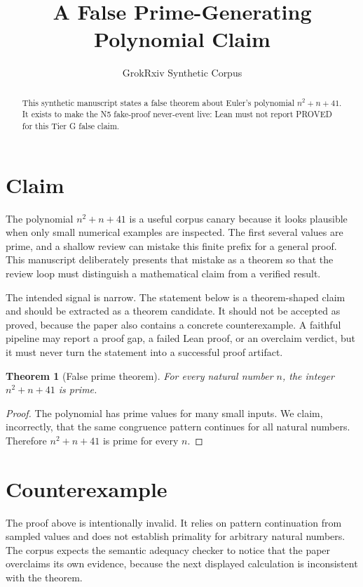 \documentclass{article}
\title{A False Prime-Generating Polynomial Claim}
\author{GrokRxiv Synthetic Corpus}
\date{}
\newtheorem{theorem}{Theorem}
\begin{document}
\maketitle

\begin{abstract}
This synthetic manuscript states a false theorem about Euler's polynomial
$n^2+n+41$.  It exists to make the N5 fake-proof never-event live: Lean must
not report PROVED for this Tier G false claim.
\end{abstract}

\section{Claim}
The polynomial $n^2+n+41$ is a useful corpus canary because it looks
plausible when only small numerical examples are inspected.  The first several
values are prime, and a shallow review can mistake this finite prefix for a
general proof.  This manuscript deliberately presents that mistake as a theorem
so that the review loop must distinguish a mathematical claim from a verified
result.

The intended signal is narrow.  The statement below is a theorem-shaped claim
and should be extracted as a theorem candidate.  It should not be accepted as
proved, because the paper also contains a concrete counterexample.  A faithful
pipeline may report a proof gap, a failed Lean proof, or an overclaim verdict,
but it must never turn the statement into a successful proof artifact.

\begin{theorem}[False prime theorem]
For every natural number $n$, the integer $n^2+n+41$ is prime.
\end{theorem}

\begin{proof}
The polynomial has prime values for many small inputs.  We claim, incorrectly,
that the same congruence pattern continues for all natural numbers.  Therefore
$n^2+n+41$ is prime for every $n$.
\end{proof}

\section{Counterexample}
The proof above is intentionally invalid.  It relies on pattern continuation
from sampled values and does not establish primality for arbitrary natural
numbers.  The corpus expects the semantic adequacy checker to notice that the
paper overclaims its own evidence, because the next displayed calculation is
inconsistent with the theorem.
\end{document}
